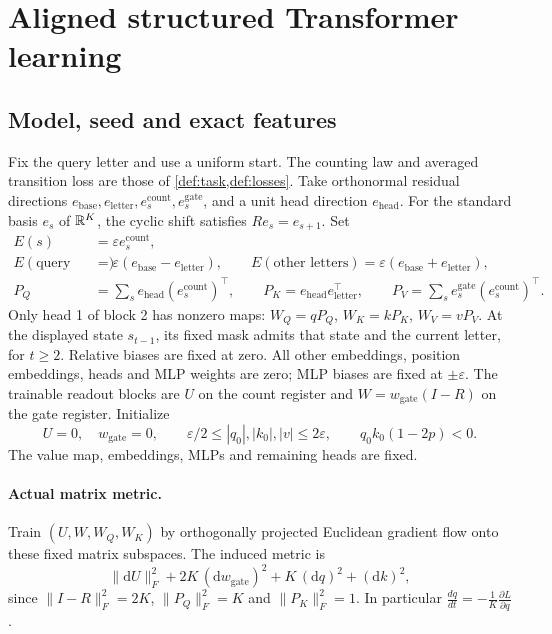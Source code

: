 \section{Aligned structured Transformer learning}
\label{app:aligned-transformer}

\subsection{Model, seed and exact features}
\label{app:aligned-seed}
Fix the query letter and use a uniform start. The counting law and averaged transition loss are those of \cref{def:task,def:losses}.
Take orthonormal residual directions $e_{\mathrm{base}},e_{\mathrm{letter}},e_s^{\mathrm{count}},
e_s^{\mathrm{gate}}$, and a unit head direction $e_{\mathrm{head}}$.
For the standard basis $e_s$ of $\mathbb R^K$, the cyclic shift satisfies $R e_s=e_{s+1}$. Set
\[
\begin{aligned}
 E(s)&=\varepsilon e_s^{\mathrm{count}},\\
 E(\text{query letter})&=\varepsilon(e_{\mathrm{base}}-e_{\mathrm{letter}}),\qquad
 E(\text{other letters})=\varepsilon(e_{\mathrm{base}}+e_{\mathrm{letter}}),\\
 P_Q&=\sum_s e_{\mathrm{head}}(e_s^{\mathrm{count}})^\top,\qquad
 P_K=e_{\mathrm{head}}e_{\mathrm{letter}}^\top,\qquad
 P_V=\sum_s e_s^{\mathrm{gate}}(e_s^{\mathrm{count}})^\top.
\end{aligned}
\]
Only head 1 of block 2 has nonzero maps:
$W_Q=qP_Q$, $W_K=kP_K$, $W_V=vP_V$. At the displayed state $s_{t-1}$,
its fixed mask admits that state and the current letter, for $t\ge2$.
Relative biases are fixed at zero.
All other embeddings, position embeddings, heads and MLP weights are zero;
MLP biases are fixed at $\pm\varepsilon$.
The trainable readout blocks are $U$ on the count register and
$W=w_{\mathrm{gate}}(I-R)$ on the gate register. Initialize
\[
 U=0,\quad w_{\mathrm{gate}}=0,\qquad
 \varepsilon/2\le |q_0|,|k_0|,|v|\le2\varepsilon,
 \qquad q_0k_0(1-2p)<0.
\]
The value map, embeddings, MLPs and remaining heads are fixed.

\paragraph{Actual matrix metric.}
Train $(U,W,W_Q,W_K)$ by orthogonally projected Euclidean gradient flow onto
these fixed matrix subspaces. The induced metric is
\begin{equation}
 \|\mathrm dU\|_F^2+2K\,(\mathrm dw_{\mathrm{gate}})^2+K\,(\mathrm dq)^2+(\mathrm dk)^2,
 \label{eq:aligned-metric}
\end{equation}
since $\|I-R\|_F^2=2K$, $\|P_Q\|_F^2=K$ and $\|P_K\|_F^2=1$.
In particular $\frac{dq}{dt}=-\frac1K\frac{\partial L}{\partial q}$.

